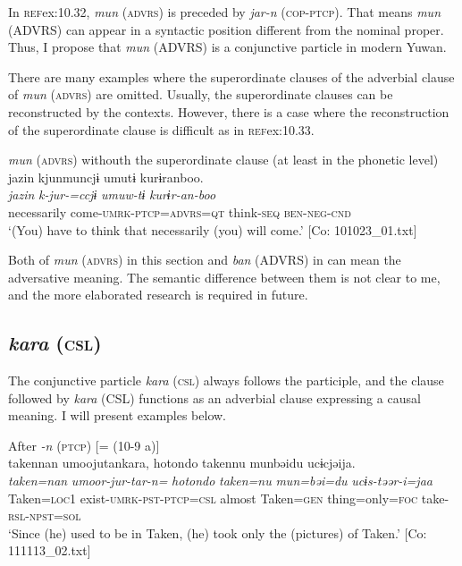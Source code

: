 In \textsc{ref}{ex:10.32}, \textit{mun} (\textsc{advrs}) is preceded by \textit{jar-n} (\textsc{cop}-\textsc{ptcp}). That means \textit{mun} (ADVRS) can appear in a syntactic position different from the nominal proper. Thus, I propose that \textit{mun} (ADVRS) is a conjunctive particle in modern Yuwan.

  There are many examples where the superordinate clauses of the adverbial clause of \textit{mun} (\textsc{advrs}) are omitted. Usually, the superordinate clauses can be reconstructed by the contexts. However, there is a case where the reconstruction of the superordinate clause is difficult as in \textsc{ref}{ex:10.33}.

\ea\label{ex:10.33}   \textit{mun} (\textsc{advrs}) withouth the superordinate clause (at least in the phonetic level)\\
      \glll    jazin  kjunmuncjɨ  umutɨ  kurɨranboo.\\
    \textit{jazin}  \textit{k-jur-=ccjɨ}  \textit{umuw-tɨ}  \textit{kurɨr-an-boo}\\
    necessarily  come-\textsc{umrk}-\textsc{ptcp}=\textsc{advrs}=\textsc{qt}  think-\textsc{seq}  \textsc{ben}-\textsc{neg}-\textsc{cnd}\\
\glt     ‘(You) have to think that necessarily (you) will come.’  [Co: 101023\_01.txt]
\z

Both of \textit{mun} (\textsc{advrs}) in this section and \textit{ban} (ADVRS) in  can mean the adversative meaning. The semantic difference between them is not clear to me, and the more elaborated research is required in future.

\subsection{\textit{kara} (\textsc{csl})}\label{sec:10.2.3}

The conjunctive particle \textit{kara} (\textsc{csl}) always follows the participle, and the clause followed by \textit{kara} (CSL) functions as an adverbial clause expressing a causal meaning. I will present examples below.

\ea\label{ex:10.34}  
\ea After \textit{{}-n} (\textsc{ptcp}) [= (10-9 a)]\\
      \glll    takennan  umoojutankara,  {\textbar}hotondo{\textbar}  takennu   munbəidu  ucɨcjəija.\\
    \textit{taken=nan}  \textit{umoor-jur-tar-n=}  \textit{hotondo}  \textit{taken=nu}  \textit{mun=bəi=du}  \textit{ucɨs-təər-i=jaa}\\
    Taken=\textsc{loc}1  exist-\textsc{umrk}-\textsc{pst}-\textsc{ptcp}=\textsc{csl}  almost  Taken=\textsc{gen}   thing=only=\textsc{foc}  take-\textsc{rsl}-\textsc{npst}=\textsc{sol}\\
\glt     ‘Since (he) used to be in Taken, (he) took only the (pictures) of Taken.’  [Co: 111113\_02.txt]


